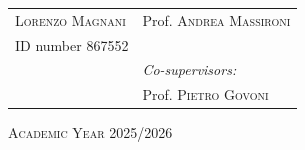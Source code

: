 \begin{titlepage}
\begin{tabularx}{\textwidth}{@{}X>{\raggedleft\arraybackslash}X@{}}
\textsc{Lorenzo Magnani} &
Prof. \textsc{Andrea Massironi} \\

ID number 867552 &
\\[0.4cm]

&
\emph{Co-supervisors:} \\

&
Prof. \textsc{Pietro Govoni}

\end{tabularx}

\vfill


{\large \textsc{Academic Year 2025/2026}}

\end{titlepage}

\restoregeometry